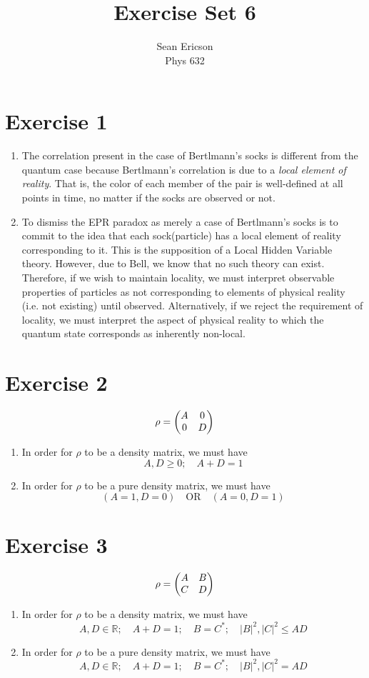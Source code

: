 \documentclass[12pt]{article}
\newcommand{\magsq}[1]{\big|#1\big|^2}
\begin{document}
	
\title{Exercise Set 6}
\author{Sean Ericson \\ Phys 632}
\maketitle

\section*{Exercise 1}
\begin{enumerate}[label=(\alph*)]
    \item The correlation present in the case of Bertlmann's socks is different from the quantum case because Bertlmann's correlation is due to a \textit{local element of reality}. That is, the color of each member of the pair is well-defined at all points in time, no matter if the socks are observed or not.
    \item To dismiss the EPR paradox as merely a case of Bertlmann's socks is to commit to the idea that each sock(particle) has a local element of reality corresponding to it. This is the supposition of a Local Hidden Variable theory. However, due to Bell, we know that no such theory can exist. Therefore, if we wish to maintain locality, we must interpret observable properties of particles as not corresponding to elements of physical reality (i.e. not existing) until observed. Alternatively, if we reject the requirement of locality, we must interpret the aspect of physical reality to which the quantum state corresponds as inherently non-local.
\end{enumerate}


\section*{Exercise 2}
\[ \rho = \mqty(A&0\\0&D) \]
\begin{enumerate}[label=(\alph*)]
    \item In order for $\rho$ to be a density matrix, we must have
    \[ A,D \geq 0; \quad A + D = 1 \]
    \item In order for $\rho$ to be a pure density matrix, we must have
    \[ (A=1, D=0) \quad\text{OR}\quad (A=0, D=1) \]
\end{enumerate}

\section*{Exercise 3}
\[ \rho = \mqty(A&B\\C&D) \]
\begin{enumerate}[label=(\alph*)]
    \item In order for $\rho$ to be a density matrix, we must have
    \[ A,D \in \mathbb{R}; \quad A+D=1; \quad B=C^*; \quad \magsq{B},\magsq{C} \leq AD \]
    \item In order for $\rho$ to be a pure density matrix, we must have
    \[ A,D \in \mathbb{R}; \quad A+D=1; \quad B=C^*; \quad \magsq{B},\magsq{C} = AD \]
\end{enumerate}
\end{document}
